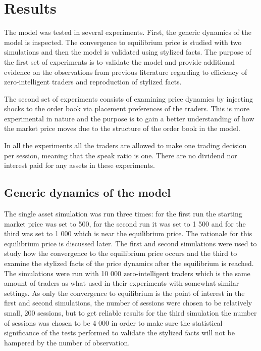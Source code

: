 
\section{Results}

The model was tested in several experiments. First, the generic dynamics of 
the model is inspected. The convergence to equilibrium price is studied with two
simulations and then the model is validated using stylized facts. 
The purpose of the first set of experiments is to validate the model and provide additional evidence 
on the observations from previous literature regarding to efficiency of zero-intelligent traders and 
reproduction of stylized facts.

The second set of experiments consists of examining price dynamics by injecting shocks to the order book via placement 
preferences of the traders. This is more experimental in nature and the purpose is to gain a better understanding of 
how the market price moves due to the structure of the order book in the model.

In all the experiments all the traders are allowed 
to make one trading decision per session, meaning that the speak ratio 
is one. There are no dividend nor interest paid for any assets in these experiments.

\subsection{Generic dynamics of the model}
The single asset simulation was run three times: for the first run
the starting market price was set to 500, for the second run it
was set to 1 500 and for the third was set to 1 000 which is near the equilibrium price. 
The rationale for this equilibrium price is discussed later.
The first and second simulations were
used to study how the convergence to the equilibrium price occurs
and the third to examine the stylized facts of the price
dynamics after the equilibrium is reached. The simulations were
run with 10 000 zero-intelligent traders which is the 
same amount of traders as what \citet{Raberto05} used in their experiments
with somewhat similar settings. As only the convergence to equilibrium is 
the point of interest in the first and second simulations, the number of sessions
were chosen to be relatively small, 200 sessions, but to get reliable results for
the third simulation the number of sessions was chosen to be 4 000 in order to 
make sure the statistical significance of the tests performed to validate the 
stylized facts will not be hampered by the number of observation.

